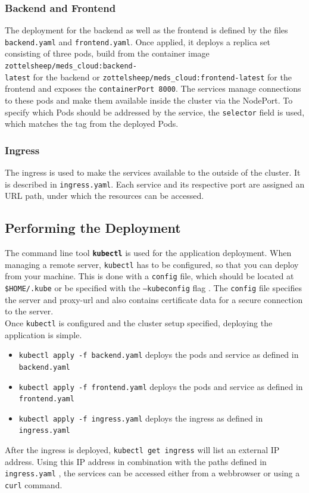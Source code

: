         \subsubsection{Backend and Frontend}
            The deployment for the backend as well as the frontend is defined by the files \texttt{backend.yaml} and \texttt{frontend.yaml}.
            Once applied, it deploys a replica set consisting of three pods, build from the container image \texttt{zottelsheep/meds\_cloud:backend-\\latest} for the backend
            or \texttt{zottelsheep/meds\_cloud:frontend-latest} for the frontend and exposes the \texttt{containerPort 8000}.
            The services manage connections to these pods and make them available inside the cluster via the NodePort. 
            To specify which Pods should be addressed by the service, the \texttt{selector} field is used, which matches the tag from the deployed Pods.

        \subsubsection{Ingress}
            The ingress is used to make the services available to the outside of the cluster.
            It is described in \texttt{ingress.yaml}.
            Each service and its respective port are assigned an URL path, under which the resources can be accessed. 
        
    \subsection{Performing the Deployment}
        The command line tool \textbf{\texttt{kubectl}} is used for the application deployment.
        When managing a remote server, \texttt{kubectl} has to be configured, so that you can deploy from your machine.
        This is done with a \texttt{config} file, which should be located at \texttt{\$HOME/.kube} or be specified with the \texttt{--kubeconfig} flag \cite{Kubernetes_kubeconfig:2022}.
        The \texttt{config} file specifies the server and proxy-url and also contains certificate data for a secure connection to the server.
        \medskip\\
        Once \texttt{kubectl} is configured and the cluster setup specified, deploying the application is simple.
        \begin{itemize}
            \item \texttt{kubectl apply -f backend.yaml} deploys the pods and service as defined in \texttt{backend.yaml}
            \item \texttt{kubectl apply -f frontend.yaml} deploys the pods and service as defined in \texttt{frontend.yaml}
            \item \texttt{kubectl apply -f ingress.yaml} deploys the ingress as defined in \texttt{ingress.yaml}
        \end{itemize}
        After the ingress is deployed, \texttt{kubectl get ingress} will list an external IP address.
        Using this IP address in combination with the paths defined in \texttt{ingress.yaml} , the services can be accessed either from a webbrowser or using a \texttt{curl} command.
    
